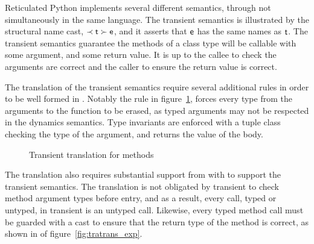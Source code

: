 \documentclass[a4paper,USenglish]{tex/lipics-v2016}
\begin{document}
Reticulated Python implements several different semantics, through not
simultaneously in the same language. The transient semantics is illustrated 
by the structural name cast, $\ShaCast\t\e$, and 
it asserts that $\e$ has the same names as $\t$. The transient
semantics guarantee the methods of a class type will be callable with
some argument, and some return value. It is up to  the callee to check the
arguments are correct and the caller to ensure the return value is correct.

The translation of the transient semantics require several additional rules in
order to be well formed in \kafka.  Notably the rule  in figure~\ref{fig:tratrans_cla}, 
forces every type from the arguments to the function to be erased,  
as typed arguments may not be respected in the dynamics semantics. Type invariants are enforced
with a tuple class checking the type of the argument, and returns the value of the body. 

\begin{figure}
\begin{mathpar}

\end{mathpar}
\caption{Transient translation for methods}
\label{fig:tratrans_cla}
\end{figure}

The translation also requires substantial support from 
with \kafka to support the transient semantics. The translation is not
obligated by transient to check method argument types before entry, and as a
result, every call,  typed or untyped, in transient is an untyped call.
Likewise, every typed method call must be guarded with a cast to ensure that
the return type of the method is correct, as shown in  of figure~\ref{fig:tratrans_exp}.
 
\end{document}
